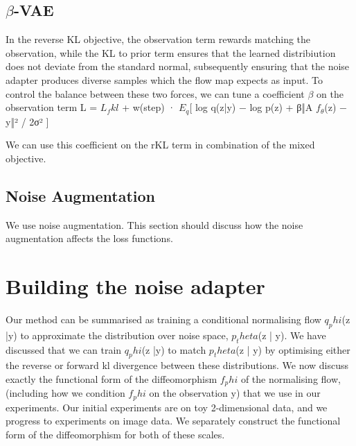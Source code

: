 \documentclass[12pt,a4paper]{report}
\begin{document}
\subsection{$\beta$-VAE}
In the reverse KL objective, the observation term rewards matching the observation, while the KL to prior term ensures that the learned distribiution does not deviate from the standard normal, subsequently ensuring that the noise adapter produces diverse samples which the flow map expects as input. 
To control the balance between these two forces, we can tune a coefficient $\beta$ on the observation term
L = $L_fkl$ + w(step) · $E_q$[ log q(z|y) − log p(z) + β‖A $f_θ$(z) − y‖² / 2σ² ]

We can use this coefficient on the rKL term in combination of the mixed objective. 


\subsection{Noise Augmentation}
We use noise augmentation. This section should discuss how the noise augmentation affects the loss functions. 

\section{Building the noise adapter}
Our method can be summarised as training a conditional normalising flow $q_phi$(z |y) to approximate the distribution over noise space, $p_theta$(z | y). We have discussed that we can train $q_phi$(z |y) to match $p_theta$(z | y) by optimising either the reverse or forward kl divergence between these distributions. 
We now discuss exactly the functional form of the diffeomorphism $f_phi$ of the normalising flow, (including how we condition $f_phi$ on the observation y) that we use in our experiments. 
Our initial experiments are on toy 2-dimensional data, and we progress to experiments on image data. 
We separately construct the functional form of the diffeomorphism for both of these scales. 
\end{document}
